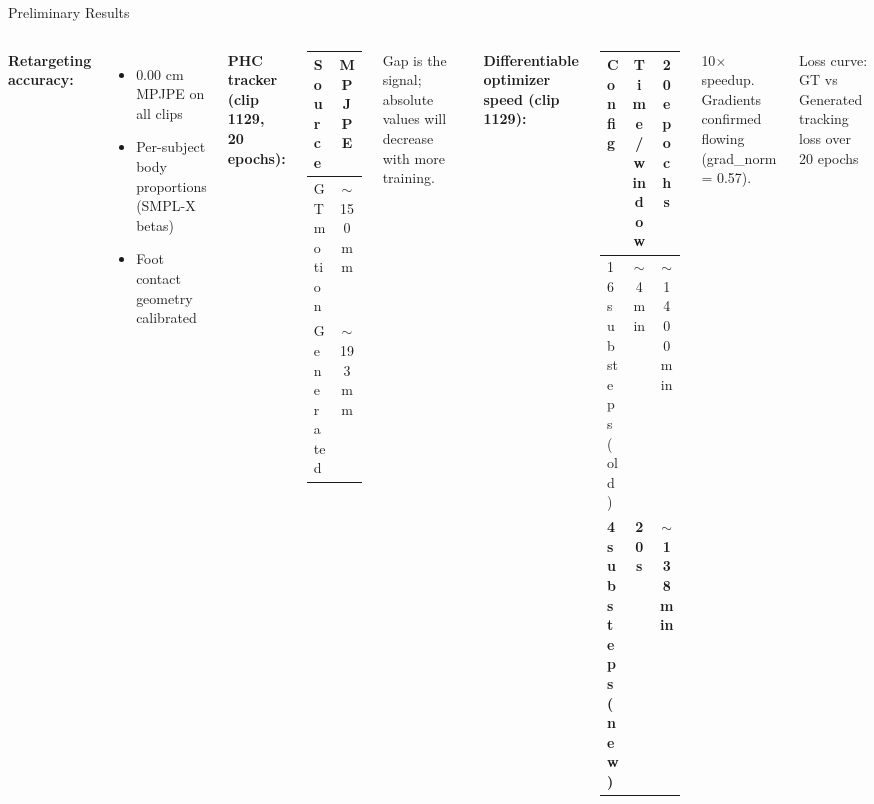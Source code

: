 \documentclass[aspectratio=169, 10pt]{beamer}
\newcommand{\tick}{\textcolor{mlgreen}{\checkmark}}
\begin{document}
\begin{frame}{Preliminary Results}
  \begin{columns}[T]
      \textbf{Retargeting accuracy:}
      \begin{itemize}
        \item[\tick] 0.00 cm MPJPE on all clips
        \item[\tick] Per-subject body proportions (SMPL-X betas)
        \item[\tick] Foot contact geometry calibrated
      \end{itemize}

      \vspace{0.6em}
      \textbf{PHC tracker (clip 1129, 20 epochs):}
      \begin{center}
      \begin{tabular}{lc}
        \toprule
        Source & MPJPE \\
        \midrule
        GT motion & $\sim$150 mm \\
        Generated  & $\sim$193 mm \\
        \bottomrule
      \end{tabular}
      \end{center}
      \small Gap is the signal; absolute values will decrease with more training.

      \textbf{Differentiable optimizer speed (clip 1129):}
      \begin{center}
      \begin{tabular}{lcc}
        \toprule
        Config & Time/window & 20 epochs \\
        \midrule
        16 substeps (old) & $\sim$4 min & $\sim$1400 min \\
        \textbf{4 substeps (new)} & \textbf{20 s} & \textbf{$\sim$138 min} \\
        \bottomrule
      \end{tabular}
      \end{center}
      \small 10$\times$ speedup. Gradients confirmed flowing (grad\_norm = 0.57).

      \vspace{0.5em}
      \begin{tcolorbox}[colback=lightyellow, colframe=notegray,
                        title={\small [IMG]Suggested figure}]
        \small Loss curve: GT vs Generated tracking loss over 20 epochs
      \end{tcolorbox}
  \end{columns}
\end{frame}
\end{document}
